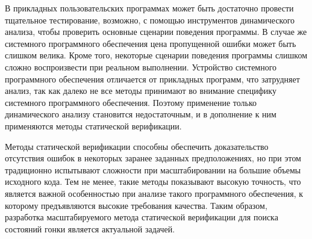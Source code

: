 В прикладных пользовательских программах может быть достаточно провести тщательное тестирование, возможно, с помощью инструментов динамического анализа, чтобы проверить основные сценарии поведения программы.
В случае же системного программного обеспечения цена пропущенной ошибки может быть слишком велика.
Кроме того, некоторые сценарии поведения программы слишком сложно воспроизвести при реальном выполнении.
Устройство системного программного обеспечения отличается от прикладных программ, что затрудняет анализ, так как далеко не все методы принимают во внимание специфику системного программного обеспечения.
Поэтому применение только динамического анализу становится недостаточным, и в дополнение к ним применяются методы статической верификации.

Методы статической верификации способны обеспечить доказательство отсутствия ошибок в некоторых заранее заданных предположениях, но при этом традиционно испытывают сложности при масштабировании на большие объемы исходного кода.
Тем не менее, такие методы показывают высокую точность, что является важной особенностью при анализе такого программного обеспечения, к которому предъявляются высокие требования качества.
Таким образом, разработка масштабируемого метода статической верификации для поиска состояний гонки является актуальной задачей.

